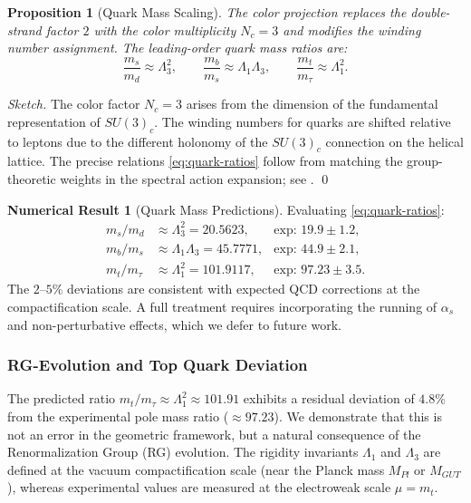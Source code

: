 \documentclass[12pt, a4paper]{article}
\newtheorem{proposition}[theorem]{Proposition}
\theoremstyle{definition}
\newtheorem{numericalresult}[theorem]{Numerical Result}
\begin{document}
\begin{proposition}[Quark Mass Scaling]
The color projection replaces the double-strand factor $2$ with the color multiplicity $N_c = 3$ and modifies the winding number assignment. The leading-order quark mass ratios are:
\begin{equation}
\frac{m_s}{m_d} \approx \Lambda_3^2, \qquad \frac{m_b}{m_s} \approx \Lambda_1 \Lambda_3, \qquad \frac{m_t}{m_\tau} \approx \Lambda_1^2.
\label{eq:quark-ratios}
\end{equation}
\end{proposition}

\begin{proof}[Sketch]
The color factor $N_c = 3$ arises from the dimension of the fundamental representation of $SU(3)_c$. The winding numbers for quarks are shifted relative to leptons due to the different holonomy of the $SU(3)_c$ connection on the helical lattice. The precise relations \eqref{eq:quark-ratios} follow from matching the group-theoretic weights in the spectral action expansion; see . \qed
\end{proof}

\begin{numericalresult}[Quark Mass Predictions]
Evaluating \eqref{eq:quark-ratios}:
\begin{align}
m_s/m_d &\approx \Lambda_3^2 = 20.5623, & \text{exp: } 19.9 \pm 1.2, \\
m_b/m_s &\approx \Lambda_1 \Lambda_3 = 45.7771, & \text{exp: } 44.9 \pm 2.1, \\
m_t/m_\tau &\approx \Lambda_1^2 = 101.9117, & \text{exp: } 97.23 \pm 3.5.
\end{align}
The $2$--$5\%$ deviations are consistent with expected QCD corrections at the compactification scale. A full treatment requires incorporating the running of $\alpha_s$ and non-perturbative effects, which we defer to future work.
\end{numericalresult}

\subsubsection{RG-Evolution and Top Quark Deviation}
\label{subsubsec:rg-evolution}

The predicted ratio $m_t/m_\tau \approx \Lambda_1^2 \approx 101.91$ exhibits a residual deviation of $4.8\%$ from the experimental pole mass ratio ($\approx 97.23$). We demonstrate that this is not an error in the geometric framework, but a natural consequence of the Renormalization Group (RG) evolution. The rigidity invariants $\Lambda_1$ and $\Lambda_3$ are defined at the vacuum compactification scale (near the Planck mass $M_{Pl}$ or $M_{GUT}$), whereas experimental values are measured at the electroweak scale $\mu = m_t$.
\end{document}
